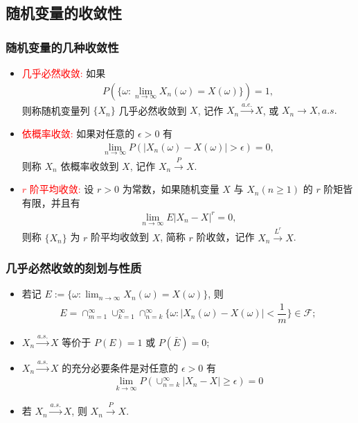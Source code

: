 \subsection{随机变量的收敛性}
\begin{frame}
	\frametitle{随机变量的几种收敛性}
	\begin{itemize}[<+-|alert@+>]
		\item \textcolor{red}{几乎必然收敛:} 如果
		\begin{eqnarray*}
			P(\{\omega:\lim_{n\rightarrow\infty}X_n(\omega)=X(\omega)\})=1,
		\end{eqnarray*} 则称随机变量列 $\{X_n\}$ 几乎必然收敛到 $X$, 记作 $X_n\stackrel{a.e.}{\rightarrow} X$, 或 $X_n\rightarrow X, a.s.$

		\item \textcolor{red}{依概率收敛:} 如果对任意的 $\epsilon>0$ 有
		\begin{eqnarray*}
			\lim_{n\rightarrow\infty}P(|X_n(\omega)-X(\omega)|>\epsilon)=0,
		\end{eqnarray*}
		则称 $X_n$ 依概率收敛到 $X$, 记作 $X_n\stackrel{P}{\rightarrow} X$.
		\item \textcolor{red}{$r$ 阶平均收敛:} 设 $r>0$ 为常数，如果随机变量 $X$ 与 $X_n (n\geq 1)$ 的 $r$ 阶矩皆有限，并且有
		\begin{eqnarray*}
			\lim_{n\rightarrow\infty}E|X_n-X|^r=0,
		\end{eqnarray*}
		则称 $\{X_n\}$ 为 $r$ 阶平均收敛到 $X$, 简称 $r$ 阶收敛，记作 $X_n\stackrel{L^r}{\rightarrow} X$.
	\end{itemize}
\end{frame}

\begin{frame}
	\frametitle{几乎必然收敛的刻划与性质}
	\begin{itemize}[<+-|alert@+>]
		\item 若记 $E:=\{\omega: \lim_{n\rightarrow\infty} X_n (\omega)=X (\omega)\}$, 则
		\begin{eqnarray*}
			E=\cap_{m=1}^\infty\cup_{k=1}^\infty\cap_{n=k}^\infty\{\omega:|X_n(\omega)-X(\omega)|<\dfrac{1}{m}\}\in \mathcal{F};
		\end{eqnarray*}
		\item $X_n\stackrel{a.s.}{\rightarrow} X$ 等价于 $P (E)=1$ 或 $P (\bar{E})=0$;
		\item $X_n\stackrel{a.s.}{\rightarrow} X$ 的充分必要条件是对任意的 $\epsilon>0$ 有
		\begin{eqnarray*}
			\lim_{k\rightarrow\infty}P(\cup_{n=k}^\infty|X_n-X|\geq \epsilon)=0
		\end{eqnarray*}
		\item 若 $X_n\stackrel{a.s.}{\rightarrow} X$, 则 $X_n\stackrel{P}{\rightarrow} X$.

	\end{itemize}

\end{frame}


